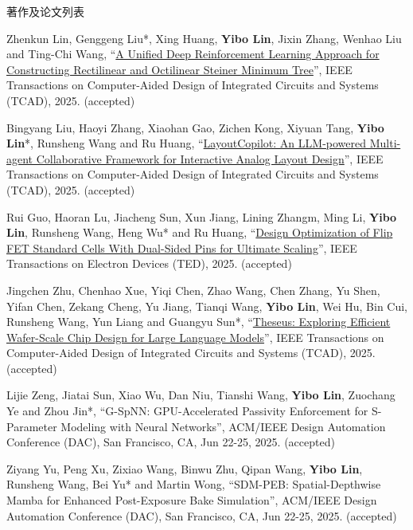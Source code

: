 \begin{rSection}{著作及论文列表}
\begin{description}[font=\normalfont, rightmargin=2em]
\item[{[J188]}]{
        Zhenkun Lin, Genggeng Liu*, Xing Huang, \textbf{Yibo Lin}, Jixin Zhang, Wenhao Liu and Ting-Chi Wang, 
    ``\href{https://doi.org/10.1109/TCAD.2024.3523429}{A Unified Deep Reinforcement Learning Approach for Constructing Rectilinear and Octilinear Steiner Minimum Tree}'', 
    IEEE Transactions on Computer-Aided Design of Integrated Circuits and Systems (TCAD), 2025.
    (accepted)
}
            

\item[{[J187]}]{
        Bingyang Liu, Haoyi Zhang, Xiaohan Gao, Zichen Kong, Xiyuan Tang, \textbf{Yibo Lin}*, Runsheng Wang and Ru Huang, 
    ``\href{https://doi.org/10.1109/TCAD.2025.3529805}{LayoutCopilot: An LLM-powered Multi-agent Collaborative Framework for Interactive Analog Layout Design}'', 
    IEEE Transactions on Computer-Aided Design of Integrated Circuits and Systems (TCAD), 2025.
    (accepted)
}
            

\item[{[J186]}]{
        Rui Guo, Haoran Lu, Jiacheng Sun, Xun Jiang, Lining Zhangm, Ming Li, \textbf{Yibo Lin}, Runsheng Wang, Heng Wu* and Ru Huang, 
    ``\href{https://doi.org/10.1109/TED.2025.3558759}{Design Optimization of Flip FET Standard Cells With Dual-Sided Pins for Ultimate Scaling}'', 
    IEEE Transactions on Electron Devices (TED), 2025.
    (accepted)
}
            

\item[{[J185]}]{
        Jingchen Zhu, Chenhao Xue, Yiqi Chen, Zhao Wang, Chen Zhang, Yu Shen, Yifan Chen, Zekang Cheng, Yu Jiang, Tianqi Wang, \textbf{Yibo Lin}, Wei Hu, Bin Cui, Runsheng Wang, Yun Liang and Guangyu Sun*, 
    ``\href{https://doi.org/10.1109/TCAD.2025.3566297}{Theseus: Exploring Efficient Wafer-Scale Chip Design for Large Language Models}'', 
    IEEE Transactions on Computer-Aided Design of Integrated Circuits and Systems (TCAD), 2025.
    (accepted)
}
            

\item[{[C184]}]{
        Lijie Zeng, Jiatai Sun, Xiao Wu, Dan Niu, Tianshi Wang, \textbf{Yibo Lin}, Zuochang Ye and Zhou Jin*, 
    ``G-SpNN: GPU-Accelerated Passivity Enforcement for S-Parameter Modeling with Neural Networks'', 
    ACM/IEEE Design Automation Conference (DAC), San Francisco, CA, Jun 22-25, 2025.
    (accepted)
}
            

\item[{[C183]}]{
        Ziyang Yu, Peng Xu, Zixiao Wang, Binwu Zhu, Qipan Wang, \textbf{Yibo Lin}, Runsheng Wang, Bei Yu* and Martin Wong, 
    ``SDM-PEB: Spatial-Depthwise Mamba for Enhanced Post-Exposure Bake Simulation'', 
    ACM/IEEE Design Automation Conference (DAC), San Francisco, CA, Jun 22-25, 2025.
    (accepted)
}
            


\end{description}
\end{rSection}
